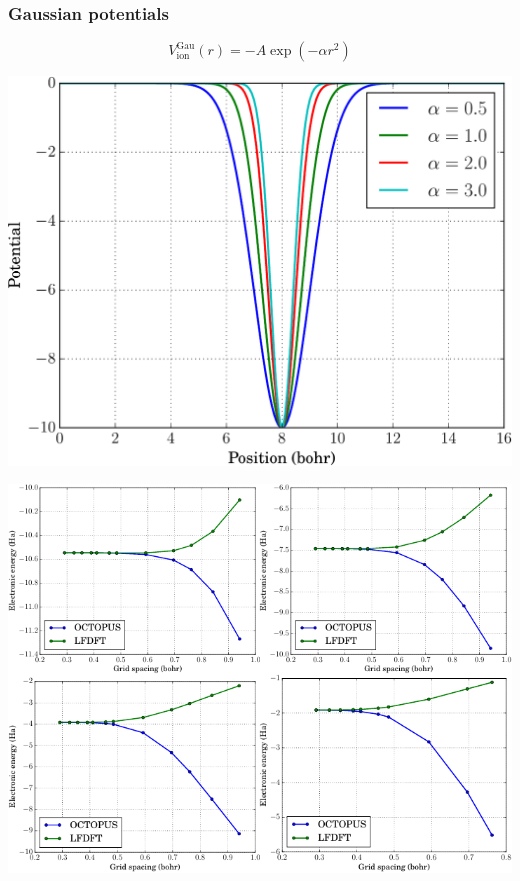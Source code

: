 \documentclass[10pt]{beamer}
\begin{document}
\begin{frame}
\frametitle{Gaussian potentials}

\begin{equation*}
V^{\mathrm{Gau}}_{\mathrm{ion}}(r) = -A\exp(-\alpha r^2)
\end{equation*}

{
\centering
\includegraphics[scale=0.5]{images/V_gauss.pdf}
\par
}

\end{frame}


\begin{frame}[plain]
  
{\centering
\includegraphics[width=\textwidth]{images/COMBINE_v2.pdf}
}

\end{frame}
\end{document}
